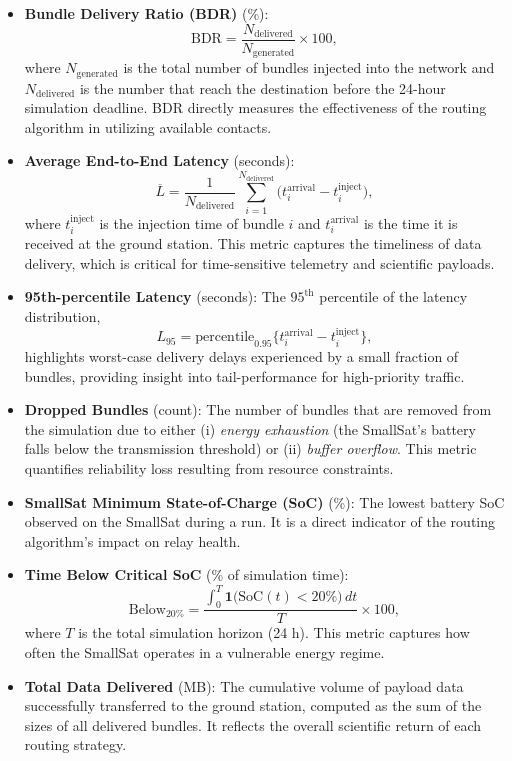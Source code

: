 \documentclass[a4paper,fleqn]{cas-dc}
\begin{document}
\begin{itemize}
  \item \textbf{Bundle Delivery Ratio (BDR)} (\%):
        \begin{equation}
          \text{BDR}
          = \frac{N_{\text{delivered}}}{N_{\text{generated}}}\times 100,
        \end{equation}
        where $N_{\text{generated}}$ is the total number of bundles injected into the network and $N_{\text{delivered}}$ is the number that reach the destination before the 24-hour simulation deadline. BDR directly measures the effectiveness of the routing algorithm in utilizing available contacts.
  \item \textbf{Average End-to-End Latency} (seconds):
        \begin{equation}
          \overline{L}
          = \frac{1}{N_{\text{delivered}}}
            \sum_{i=1}^{N_{\text{delivered}}}
            \bigl(t^{\text{arrival}}_{i} - t^{\text{inject}}_{i}\bigr),
        \end{equation}
        where $t^{\text{inject}}_{i}$ is the injection time of bundle $i$ and $t^{\text{arrival}}_{i}$ is the time it is received at the ground station. This metric captures the timeliness of data delivery, which is critical for time-sensitive telemetry and scientific payloads.
  \item \textbf{95th-percentile Latency} (seconds):
        The $95^{\text{th}}$ percentile of the latency distribution,
        \[
          L_{95} = \text{percentile}_{0.95}\bigl\{t^{\text{arrival}}_{i} - t^{\text{inject}}_{i}\bigr\},
        \]
        highlights worst-case delivery delays experienced by a small fraction of bundles, providing insight into tail-performance for high-priority traffic.
  \item \textbf{Dropped Bundles} (count):
        The number of bundles that are removed from the simulation due to either (i) \emph{energy exhaustion} (the SmallSat's battery falls below the transmission threshold) or (ii) \emph{buffer overflow}. This metric quantifies reliability loss resulting from resource constraints.
  \item \textbf{SmallSat Minimum State-of-Charge (SoC)} (\%):
        The lowest battery SoC observed on the SmallSat during a run. It is a direct indicator of the routing algorithm's impact on relay health.
  \item \textbf{Time Below Critical SoC} (\% of simulation time):
        \begin{equation}
          \text{Below}_{20\%}
          = \frac{\displaystyle\int_{0}^{T}
                 \mathbf{1}\bigl(\text{SoC}(t) < 20\%\bigr)\,dt}
                 {T}\times 100,
        \end{equation}
        where $T$ is the total simulation horizon (24 h). This metric captures how often the SmallSat operates in a vulnerable energy regime.
  \item \textbf{Total Data Delivered} (MB):
        The cumulative volume of payload data successfully transferred to the ground station, computed as the sum of the sizes of all delivered bundles. It reflects the overall scientific return of each routing strategy.
\end{itemize}
\end{document}
